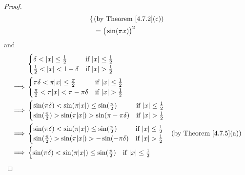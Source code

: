 \begin{proof}
\begin{align*}
\begin{cases}
                                           \end{cases} & \text{(by Theorem \ref{4.7.2}(c))} \\
                                       & = \big(\sin(\pi x)\big)^2
    \end{align*}
    and
    \begin{align*}
                 & \begin{cases}
                       \delta < \abs*{x} \leq \frac{1}{2}  & \text{if } \abs*{x} \leq \frac{1}{2} \\
                       \frac{1}{2} < \abs*{x} < 1 - \delta & \text{if } \abs*{x} > \frac{1}{2}    \\
                   \end{cases}                               \\
        \implies & \begin{cases}
                       \pi \delta < \pi \abs*{x} \leq \frac{\pi}{2}    & \text{if } \abs*{x} \leq \frac{1}{2} \\
                       \frac{\pi}{2} < \pi \abs*{x} < \pi - \pi \delta & \text{if } \abs*{x} > \frac{1}{2}    \\
                   \end{cases}                   \\
        \implies & \begin{cases}
                       \sin(\pi \delta) < \sin(\pi \abs*{x}) \leq \sin(\frac{\pi}{2})    & \text{if } \abs*{x} \leq \frac{1}{2} \\
                       \sin(\frac{\pi}{2}) > \sin(\pi \abs*{x}) > \sin(\pi - \pi \delta) & \text{if } \abs*{x} > \frac{1}{2}    \\
                   \end{cases} \\
        \implies & \begin{cases}
                       \sin(\pi \delta) < \sin(\pi \abs*{x}) \leq \sin(\frac{\pi}{2}) & \text{if } \abs*{x} \leq \frac{1}{2} \\
                       \sin(\frac{\pi}{2}) > \sin(\pi \abs*{x}) > -\sin(-\pi \delta)  & \text{if } \abs*{x} > \frac{1}{2}    \\
                   \end{cases}    & \text{(by Theorem \ref{4.7.5}(a))}    \\
        \implies & \begin{cases}
                       \sin(\pi \delta) < \sin(\pi \abs*{x}) \leq \sin(\frac{\pi}{2}) & \text{if } \abs*{x} \leq \frac{1}{2} \\

\end{cases}
\end{align*}
\end{proof}
